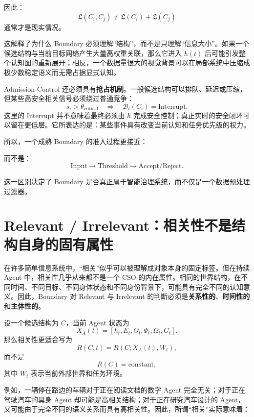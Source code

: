 因此：
\[
\mathfrak{L}(C_i,C_j)
\neq
\mathfrak{L}(C_i)
+
\mathfrak{L}(C_j)
\]
通常才是现实情况。

这解释了为什么 Boundary 必须理解“结构”，而不是只理解“信息大小”。如果一个候选结构与当前目标网络产生大量高权重关联，那么它进入 $h(t)$ 后可能引发整个认知图的重新展开；相反，一个数据量很大的视觉背景可以在局部系统中压缩成极少数稳定语义而无需占据显式认知。

Admission Control 还必须具有\textbf{抢占机制}。一般候选结构可以排队、延迟或压缩，但某些高安全相关信号必须绕过普通竞争：
\[
s_i>\theta_{\mathrm{critical}}
\quad\Rightarrow\quad
\mathcal{B}_t(C_i)
=
\mathrm{Interrupt}.
\]
这里的 Interrupt 并不意味着最终必须由 $h$ 完成安全控制；真正实时的安全闭环可以留在更低层。它所表达的是：某些事件具有改变当前认知和任务优先级的权力。

所以，一个成熟 Boundary 的准入过程更接近：
\begin{statementbox}
\centering
{}
\end{statementbox}
而不是：
\[
\text{Input}
\rightarrow
\text{Threshold}
\rightarrow
\text{Accept/Reject}.
\]

这一区别决定了 Boundary 是否真正属于智能治理系统，而不仅是一个数据预处理过滤器。


\section{Relevant / Irrelevant：相关性不是结构自身的固有属性}

在许多简单信息系统中，“相关”似乎可以被理解成对象本身的固定标签。但在持续 Agent 中，相关性几乎从来都不是一个 CSO 的内在属性。相同的世界结构，在不同时间、不同目标、不同身体状态和不同身份背景下，可能具有完全不同的认知意义。因此，Boundary 对 Relevant 与 Irrelevant 的判断必须是\textbf{关系性的}、\textbf{时间性的}和\textbf{主体性的}。

设一个候选结构为 $C$，当前 Agent 状态为
\[
X_A(t)
=
[
h_t,E_t,\Theta_t,\Psi_t,\Omega_t,G_t
].
\]
那么相关性更适合写为
\[
R(C,t)
=
R
\left(
C;
X_A(t),
W_t
\right),
\]
而不是
\[
R(C)=\mathrm{constant},
\]
其中 $W_t$ 表示当前外部世界和任务环境。

例如，一辆停在路边的车辆对于正在阅读文档的数字 Agent 完全无关；对于正在驾驶汽车的具身 Agent 却可能是高相关结构；对于正在研究汽车设计的 Agent，又可能由于完全不同的语义关系而具有高相关性。因此，所谓“相关”实际意味着：
\begin{statementbox}
\centering
{}
\end{statementbox}

